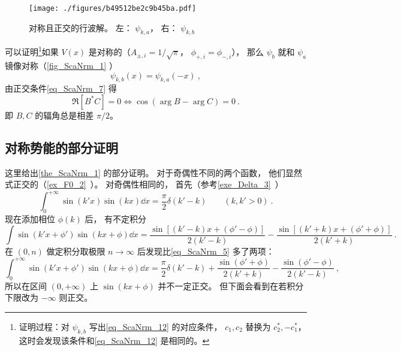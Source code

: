\begin{figure}[ht]
\centering
\texttt{[image: ./figures/b49512be2c9b45ba.pdf]}
\caption{对称且正交的行波解。 左： $\psi_{k,a}$， 右： $\psi_{k,b}$} \label{fig_ScaNrm_1}
\end{figure}

可以证明\footnote{证明过程：对 $\psi_{k,b}$ 写出\autoref{eq_ScaNrm_12} 的对应条件， $c_1,c_2$ 替换为 $c_2^*, -c_1^*$， 这时会发现该条件和\autoref{eq_ScaNrm_12} 是相同的。}如果 $V(x)$ 是对称的（$A_{\pm,i} = 1/\sqrt{\pi}$， $\phi_{+,i}=\phi_{-,i}$）， 那么 $\psi_b$ 就和 $\psi_a$ 镜像对称（\autoref{fig_ScaNrm_1} ）
\begin{equation}
\psi_{k,b}(x) = \psi_{k,a}(-x)~,
\end{equation}
由正交条件\autoref{eq_ScaNrm_7} 得
\begin{equation}\label{eq_ScaNrm_11}
\Re[B^*C] = 0 \Longleftrightarrow \cos(\arg{B} - \arg{C}) = 0~.
\end{equation}
即 $B,C$ 的辐角总是相差 $\pi/2$。

\subsection{对称势能的部分证明}
这里给出\autoref{the_ScaNrm_1} 的部分证明。 对于奇偶性不同的两个函数， 他们显然式正交的（\autoref{ex_F0_2}~）。 对奇偶性相同的， 首先（参考\autoref{exe_Delta_3}~）
\begin{equation}\label{eq_ScaNrm_5}
\int_{0}^{+\infty} \sin(k'x)\sin(kx)\dd{x} = \frac{\pi}{2}\delta(k'-k)
\qquad (k, k' > 0)~.
\end{equation}
现在添加相位 $\phi(k)$ 后， 有不定积分
\begin{equation}
\int \sin(k'x+\phi')\sin(kx+\phi) \dd{x} = \frac{\sin[(k'-k)x + (\phi'-\phi)]}{2(k'-k)}
- \frac{\sin[(k'+k)x+(\phi'+\phi)]}{2(k'+k)}~.
\end{equation}
在 $(0,n)$ 做定积分取极限 $n\to\infty$ 后发现比\autoref{eq_ScaNrm_5} 多了两项：
\begin{equation}
\int_{0}^{+\infty} \sin(k'x+\phi')\sin(kx+\phi) \dd{x} = \frac{\pi}{2}\delta(k'-k)
+ \frac{\sin(\phi'+\phi)}{2(k'+k)} - \frac{\sin(\phi'-\phi)}{2(k'-k)}~,
\end{equation}
所以在区间 $(0, +\infty)$ 上 $\sin(kx+\phi)$ 并不一定正交。 但下面会看到在若积分下限改为 $-\infty$ 则正交。

